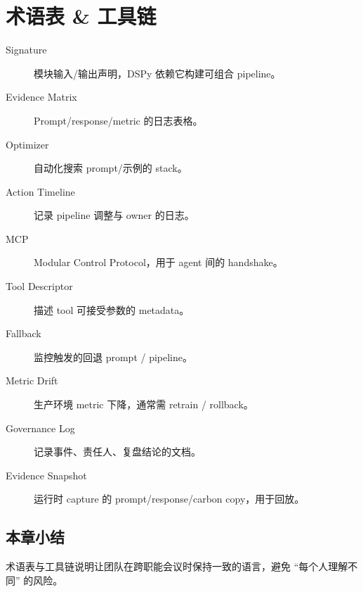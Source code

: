 \section{术语表 \& 工具链}

\begin{description}
    \item[Signature] 模块输入/输出声明，DSPy 依赖它构建可组合 pipeline。
    \item[Evidence Matrix] Prompt/response/metric 的日志表格。
    \item[Optimizer] 自动化搜索 prompt/示例的 stack。
    \item[Action Timeline] 记录 pipeline 调整与 owner 的日志。
    \item[MCP] Modular Control Protocol，用于 agent 间的 handshake。
    \item[Tool Descriptor] 描述 tool 可接受参数的 metadata。
    \item[Fallback] 监控触发的回退 prompt / pipeline。
    \item[Metric Drift] 生产环境 metric 下降，通常需 retrain / rollback。
    \item[Governance Log] 记录事件、责任人、复盘结论的文档。
    \item[Evidence Snapshot] 运行时 capture 的 prompt/response/carbon copy，用于回放。
\end{description}

\subsection{本章小结}

术语表与工具链说明让团队在跨职能会议时保持一致的语言，避免 ``每个人理解不同'' 的风险。
